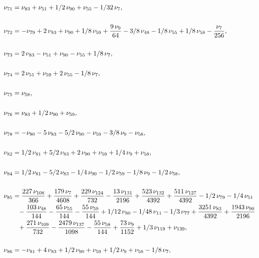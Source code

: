 \documentclass[a4paper,12pt, DIV=14, BCOR=5mm, twoside, headsepline, numbers=noenddot]{scrbook}
\begin{document}
\begin{align}\label{AreaSol7}
\begin{aligned}
\nu_{{71}}&=\nu_{{83}}+\nu_{{51}}+1/2\,\nu_{{90}}
+\nu_{{55}}-1/32\,\nu_{{7}}, \\
\\
\nu_{{72}}&=-\nu_{{79}}+2\,\nu_{{83}}+\nu_{
{90}}+1/8\,\nu_{{59}}+{\frac {9\,\nu_{{9}}}{64}}-3/8\,\nu_{{48}}-1/8\,
\nu_{{55}}+1/8\,\nu_{{58}}-{\frac {\nu_{{7}}}{256}},\\
\\
\nu_{{73}}&=2\,\nu_
{{83}}-\nu_{{51}}+\nu_{{90}}-\nu_{{55}}+1/8\,\nu_{{7}}, \\
\\
\nu_{{74}}&=2\,
\nu_{{51}}+\nu_{{59}}+2\,\nu_{{55}}-1/8\,\nu_{{7}}, \\
\\
\nu_{{75}}&=\nu_{{58
}}, \\
\\
\nu_{{76}}&=\nu_{{83}}+1/2\,\nu_{{90}}+\nu_{{59}}, \\
\\
\nu_{{78}}&=-\nu_{{
80}}-5\,\nu_{{83}}-5/2\,\nu_{{90}}-\nu_{{59}}-3/8\,\nu_{{9}}-\nu_{{58}
}, \\
\\
\nu_{{82}}&=1/2\,\nu_{{81}}+5/2\,\nu_{{83}}+2\,\nu_{{90}}+\nu_{{59}}+
1/4\,\nu_{{9}}+\nu_{{58}}, \\
\\
\nu_{{84}}&=1/2\,\nu_{{81}}-5/2\,\nu_{{83}}-1
/4\,\nu_{{90}}-1/2\,\nu_{{59}}-1/8\,\nu_{{9}}-1/2\,\nu_{{58}}, \\
\\
\nu_{{85
}}&={\frac {227\,\nu_{{108}}}{366}}+{\frac {179\,\nu_{{7}}}{4608}}+{
\frac {229\,\nu_{{124}}}{732}}-{\frac {13\,\nu_{{131}}}{2196}}+{\frac 
{523\,\nu_{{132}}}{4392}}+{\frac {511\,\nu_{{127}}}{4392}}-1/2\,\nu_{{
79}}-1/4\,\nu_{{51}}\\
 &\hphantom{=}-{\frac {103\,\nu_{{48}}}{144}}-{\frac {65\,\nu_{{
55}}}{144}}-{\frac {55\,\nu_{{59}}}{144}}+1/12\,\nu_{{80}}-1/48\,\nu_{
{11}}-1/3\,\nu_{{77}}+{\frac {3251\,\nu_{{83}}}{4392}}+{\frac {1943\,
\nu_{{90}}}{2196}}\\
 &\hphantom{=}+{\frac {271\,\nu_{{109}}}{732}}-{\frac {2479\,\nu_{
{137}}}{1098}}-{\frac {55\,\nu_{{58}}}{144}}+{\frac {73\,\nu_{{9}}}{
1152}}+1/3\,\nu_{{119}}+\nu_{{139}}, \\
\\
\nu_{{86}}&=-\nu_{{81}}+4\,\nu_{{83
}}+1/2\,\nu_{{90}}+\nu_{{59}}+1/2\,\nu_{{9}}+\nu_{{58}}-1/8\,\nu_{{7}},\\

\end{aligned}
\end{align}
\end{document}
